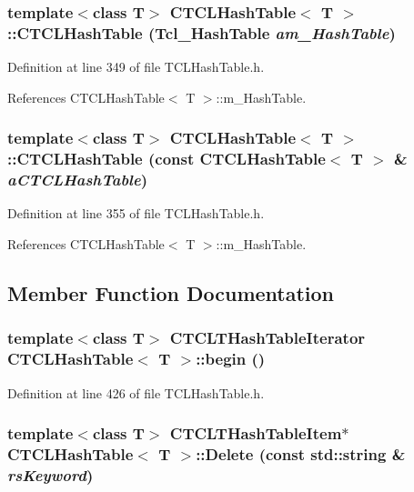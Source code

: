 \subsubsection{\setlength{\rightskip}{0pt plus 5cm}template$<$class T$>$ CTCLHash\-Table$<$ T $>$::CTCLHash\-Table (Tcl\_\-Hash\-Table {\em am\_\-Hash\-Table})\hspace{0.3cm}{\tt  [inline]}}\label{classCTCLHashTable_a2}




Definition at line 349 of file TCLHash\-Table.h.

References CTCLHash\-Table$<$ T $>$::m\_\-Hash\-Table.
\subsubsection{\setlength{\rightskip}{0pt plus 5cm}template$<$class T$>$ CTCLHash\-Table$<$ T $>$::CTCLHash\-Table (const CTCLHash\-Table$<$ T $>$ \& {\em a\-CTCLHash\-Table})\hspace{0.3cm}{\tt  [inline]}}\label{classCTCLHashTable_a3}




Definition at line 355 of file TCLHash\-Table.h.

References CTCLHash\-Table$<$ T $>$::m\_\-Hash\-Table.

\subsection{Member Function Documentation}
\subsubsection{\setlength{\rightskip}{0pt plus 5cm}template$<$class T$>$ {\bf CTCLTHash\-Table\-Iterator} CTCLHash\-Table$<$ T $>$::begin ()\hspace{0.3cm}{\tt  [inline]}}\label{classCTCLHashTable_a10}




Definition at line 426 of file TCLHash\-Table.h.
\subsubsection{\setlength{\rightskip}{0pt plus 5cm}template$<$class T$>$ {\bf CTCLTHash\-Table\-Item}$\ast$ CTCLHash\-Table$<$ T $>$::Delete (const std::string \& {\em rs\-Keyword})\hspace{0.3cm}{\tt  [inline]}}\label{classCTCLHashTable_a9}




